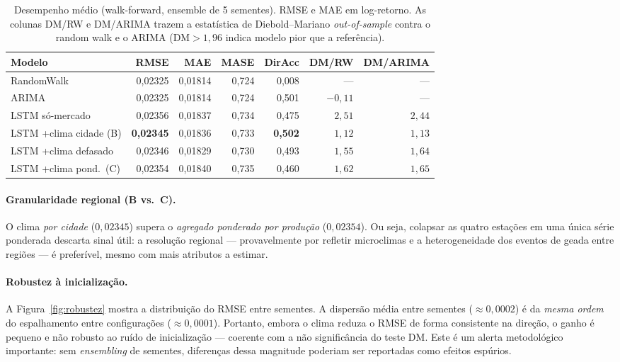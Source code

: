 \documentclass[12pt]{article}
\begin{document}
\begin{table}[ht]
\centering
\caption{Desempenho médio (walk-forward, ensemble de 5 sementes). RMSE e MAE em
log-retorno. As colunas DM/RW e DM/ARIMA trazem a estatística de Diebold--Mariano
\emph{out-of-sample} contra o random walk e o ARIMA ($\mathrm{DM}>1{,}96$ indica modelo
pior que a referência).}
\label{tab:comparativa}
\small
\setlength{\tabcolsep}{5pt}
\begin{tabular}{lrrrrrr}
\toprule
Modelo & RMSE & MAE & MASE & DirAcc & DM/RW & DM/ARIMA \\
\midrule
RandomWalk              & 0,02325 & 0,01814 & 0,724 & 0,008 & --- & --- \\
ARIMA                   & 0,02325 & 0,01814 & 0,724 & 0,501 & $-0,11$ & --- \\
LSTM só-mercado         & 0,02356 & 0,01837 & 0,734 & 0,475 & $2,51$ & $2,44$ \\
LSTM +clima cidade (B)  & \textbf{0,02345} & 0,01836 & 0,733 & \textbf{0,502} & $1,12$ & $1,13$ \\
LSTM +clima defasado    & 0,02346 & 0,01829 & 0,730 & 0,493 & $1,55$ & $1,64$ \\
LSTM +clima pond.\ (C)  & 0,02354 & 0,01840 & 0,735 & 0,460 & $1,62$ & $1,65$ \\
\bottomrule
\end{tabular}
\end{table}

\paragraph{Granularidade regional (B vs.\ C).} O clima \emph{por cidade} ($0{,}02345$)
supera o \emph{agregado ponderado por produção} ($0{,}02354$). Ou seja, colapsar as
quatro estações em uma única série ponderada descarta sinal útil: a resolução regional
--- provavelmente por refletir microclimas e a heterogeneidade dos eventos de geada
entre regiões --- é preferível, mesmo com mais atributos a estimar.

\paragraph{Robustez à inicialização.} A Figura~\ref{fig:robustez} mostra a distribuição
do RMSE entre sementes. A dispersão média entre sementes ($\approx 0{,}0002$) é da
\emph{mesma ordem} do espalhamento entre configurações ($\approx 0{,}0001$). Portanto,
embora o clima reduza o RMSE de forma consistente na direção, o ganho é pequeno e não
robusto ao ruído de inicialização --- coerente com a não significância do teste DM.
Este é um alerta metodológico importante: sem \emph{ensembling} de sementes, diferenças
dessa magnitude poderiam ser reportadas como efeitos espúrios.
\end{document}
